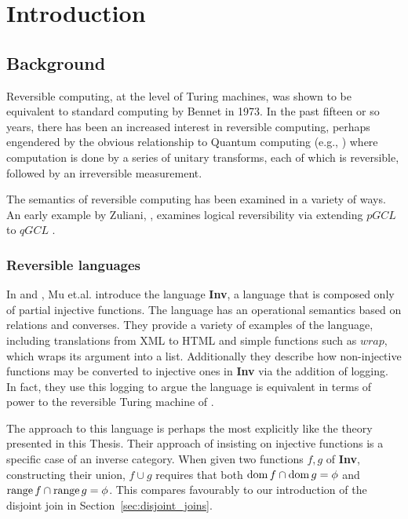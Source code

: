 \chapter{Introduction}
\section{Background}
\label{sec:background}

Reversible computing, at the level of Turing machines, was shown to be equivalent to standard
computing by Bennet \cite{bennett:1973reverse} in 1973. In the past fifteen or so years, there has
been an increased interest in reversible computing, perhaps engendered by the obvious relationship
to Quantum computing (e.g., \cite{neilsen2000:QuantumComputationAndInfo}) where computation is done
by a series of unitary transforms, each of which is reversible, followed by an irreversible
measurement.

The semantics of reversible computing has been examined in a variety of ways. An early example by
Zuliani, \cite{zuliani01:reversibility}, examines logical reversibility via extending $pGCL$
\cite{MorganIver99} to $qGCL$ \cite{sanders:quantum}.

\subsection{Reversible languages}
\label{subsec:reversible_languages}
In \cite{mu06bidirectional} and \cite{muetal04:injreversible}, Mu et.al. introduce the language
\textbf{Inv}, a language that is composed only of partial injective functions. The language has an
operational semantics based on relations and converses. They provide a variety of examples of the
language, including translations from XML to HTML and simple functions such as $wrap$, which wraps
its argument into a list. Additionally they describe how non-injective functions may be converted to
injective ones in \textbf{Inv} via the addition of logging. In fact, they use this logging to argue
the language is equivalent in terms of power to the reversible Turing machine of
\cite{bennett:1973reverse}.

The approach to this language is perhaps the most explicitly like the theory presented in this
Thesis. Their approach of insisting on injective functions is a specific case of an inverse
category. When given two functions $f,g$ of \textbf{Inv}, constructing their union, $f\cup g$
requires that both $\operatorname*{dom} f \cap \operatorname*{dom} g = \phi$ and $\operatorname*{range} f \cap \operatorname*{range} g = \phi$. This
compares favourably to our introduction of the disjoint join in Section~\ref{sec:disjoint_joins}.


